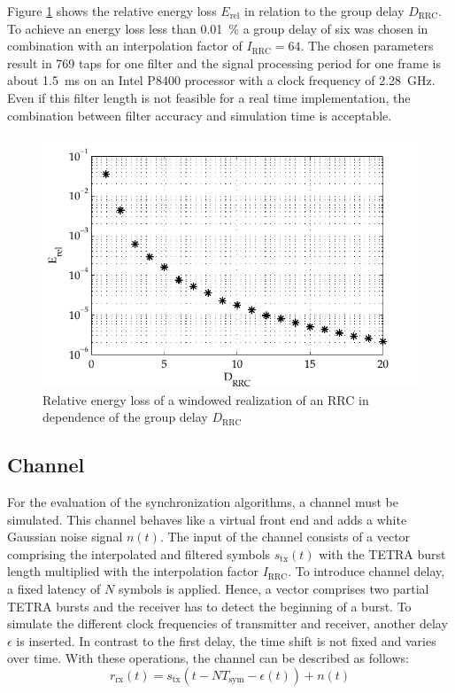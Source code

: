 Figure \ref{fig:RRC_group_delay} shows the relative energy loss $E_\text{rel}$ in relation to the group delay $D_\text{RRC}$. To achieve an energy loss less than \SI{0.01}{\%} a group delay of six was chosen in combination with an interpolation factor of $I_\text{RRC} = 64$. The chosen parameters result in 769 taps for one filter and the signal processing period for one frame is about \SI{1.5}{ms} on an Intel P8400 processor with a clock frequency of \SI{2.28}{GHz}. Even if this filter length is not feasible for a real time implementation, the combination between filter accuracy and simulation time is acceptable.
\begin{figure}[htb]
	\centering
		\includegraphics[width=1.00\textwidth]{../kapitel04/figures/RRC_group_delay.pdf}
	\caption{Relative energy loss of a windowed realization of an RRC in dependence of the group delay $D_\text{RRC}$}
	\label{fig:RRC_group_delay}
\end{figure}



\subsection{Channel}
For the evaluation of the synchronization algorithms, a channel must be simulated. This channel behaves like a virtual front end and adds a white Gaussian noise signal $n(t)$. The input of the channel consists of a vector comprising the interpolated and filtered symbols $s_\text{tx}(t)$ with the TETRA burst length multiplied with the interpolation factor $I_\text{RRC}$. To introduce channel delay, a fixed latency of $N$ symbols is applied. Hence, a vector comprises two partial TETRA bursts and the receiver has to detect the beginning of a burst. To simulate the different clock frequencies of transmitter and receiver, another delay $\epsilon$ is inserted. In contrast to the first delay, the time shift is not fixed and varies over time. With these operations, the channel can be described as follows:
\begin{equation}
r_\text{rx}(t) = s_\text{tx}\left( t-N T_\text{sym} - \epsilon(t) \right) + n(t)
\end{equation}

